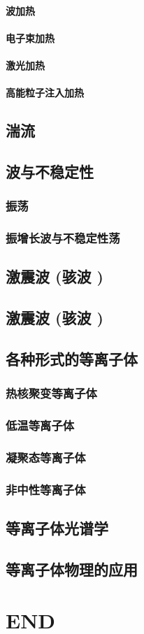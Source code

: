 \documentclass[UTF8]{../06-Physics}
\begin{document}
    \subsubsection{波加热}
    \subsubsection{电子束加热}
    \subsubsection{激光加热}
    \subsubsection{高能粒子注入加热}
\section{湍流}
\section{波与不稳定性}
    \subsection{振荡}
    \subsection{振增长波与不稳定性荡}
\section{激震波 (骇波 )}
\section{激震波 (骇波 )}

\section{各种形式的等离子体}
    \subsection{热核聚变等离子体}
    \subsection{低温等离子体}
    \subsection{凝聚态等离子体}
    \subsection{非中性等离子体}


\section{等离子体光谱学}

\section{等离子体物理的应用}







\chapter{END}
\end{document}

